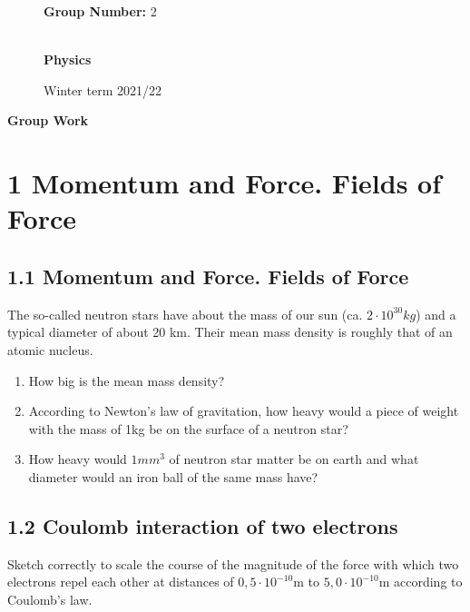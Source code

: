 \documentclass[10pt,ngerman]{scrartcl}
\begin{document}
\begin{figure}[htbp]
\begin{minipage}[b]{0.50\linewidth}
\begin{Large}
	\textbf{Group Number:} 2\\
	\\
	
\end{Large}
\end{minipage}
\begin{minipage}[b]{0.50\linewidth}
\begin{flushright}
\begin{Huge}
\textbf{Physics}\\
\end{Huge}
\vspace{0.5cm}
\begin{large}
Winter term 2021/22
\end{large}
\end{flushright}
\end{minipage}
\end{figure}

\vspace{2cm}
\begin{huge}
\noindent

\textbf{Group Work}
\end{huge}

\section{1 Momentum and Force. Fields of Force}
\subsection{1.1 Momentum and Force. Fields of Force}
The so-called neutron stars have about the mass of our sun (ca. $2 \cdot 10^{30}kg$) and a typical diameter of about 20 km. Their mean mass density is roughly that of an atomic nucleus.
\begin{enumerate}
	\item How big is the mean mass density?
	\item According to Newton's law of gravitation, how heavy would a piece of weight with the mass of 1kg be on the surface of a neutron star?
	\item How heavy would $1mm^3$ of neutron star matter be on earth and what diameter would an iron ball of the same mass have?
\end{enumerate}

\subsection{1.2 Coulomb interaction of two electrons}
Sketch correctly to scale the course of the magnitude of the force with which two electrons repel each other at distances of $0,5 \cdot 10^{-10}$m to $5,0 \cdot 10^{-10}$m according to Coulomb's law.
\end{document}
